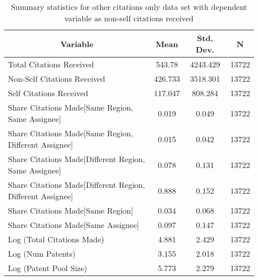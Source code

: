 
\begin{table}[htbp]\centering \caption{Summary statistics for other citations only data set with dependent variable as non-self citations received  \label{o.nsummary}}
\begin{tabular}{l c c  c}\hline\hline
\multicolumn{1}{c}{\textbf{Variable}} & \textbf{Mean}
 & \textbf{Std. Dev.} & \textbf{N}\\ \hline
Total Citations Received & 543.78 & 4243.429  & 13722\\
Non-Self Citations Received & 426.733 & 3518.301  & 13722\\
Self Citations Received & 117.047 & 808.284  & 13722\\
Share Citations Made[Same Region, Same Assignee] & 0.019 & 0.049  & 13722\\
Share Citations Made[Same Region, Different Assignee] & 0.015 & 0.042  & 13722\\
Share Citations Made[Different Region, Same Assignee] & 0.078 & 0.131  & 13722\\
Share Citations Made[Different Region, Different Assignee] & 0.888 & 0.152  & 13722\\
Share Citations Made[Same Region] & 0.034 & 0.068  & 13722\\
Share Citations Made[Same Assignee] & 0.097 & 0.147  & 13722\\
Log (Total Citations Made) & 4.881 & 2.429  & 13722\\
Log (Num Patents) & 3.155 & 2.018  & 13722\\
Log (Patent Pool Size) & 5.773 & 2.279  & 13722\\
\hline\end{tabular}
\end{table}

